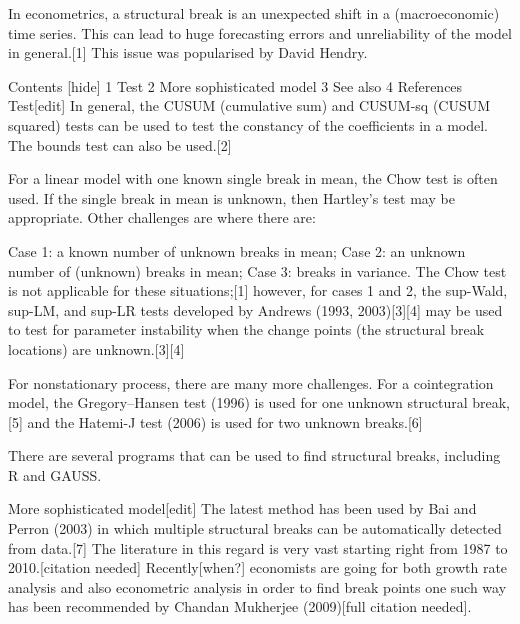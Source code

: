 In econometrics, a structural break is an unexpected shift in a (macroeconomic) time series. This can lead to huge forecasting errors and unreliability of the model in general.[1] This issue was popularised by David Hendry.

Contents  [hide] 
1	Test
2	More sophisticated model
3	See also
4	References
Test[edit]
In general, the CUSUM (cumulative sum) and CUSUM-sq (CUSUM squared) tests can be used to test the constancy of the coefficients in a model. The bounds test can also be used.[2]

For a linear model with one known single break in mean, the Chow test is often used. If the single break in mean is unknown, then Hartley's test may be appropriate. Other challenges are where there are:

Case 1: a known number of unknown breaks in mean;
Case 2: an unknown number of (unknown) breaks in mean;
Case 3: breaks in variance.
The Chow test is not applicable for these situations;[1] however, for cases 1 and 2, the sup-Wald, sup-LM, and sup-LR tests developed by Andrews (1993, 2003)[3][4] may be used to test for parameter instability when the change points (the structural break locations) are unknown.[3][4]

For nonstationary process, there are many more challenges. For a cointegration model, the Gregory–Hansen test (1996) is used for one unknown structural break,[5] and the Hatemi-J test (2006) is used for two unknown breaks.[6]

There are several programs that can be used to find structural breaks, including R and GAUSS.

More sophisticated model[edit]
The latest method has been used by Bai and Perron (2003) in which multiple structural breaks can be automatically detected from data.[7] The literature in this regard is very vast starting right from 1987 to 2010.[citation needed] Recently[when?] economists are going for both growth rate analysis and also econometric analysis in order to find break points one such way has been recommended by Chandan Mukherjee (2009)[full citation needed].
